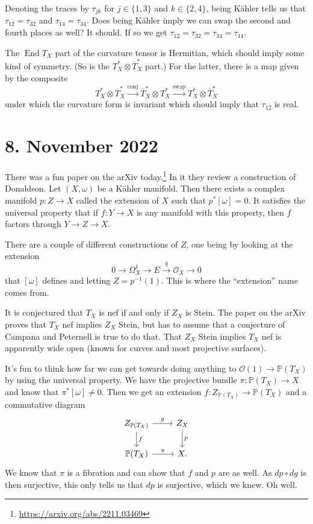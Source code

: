 \documentclass[11pt]{amsart}
\theoremstyle{definition}
\newcommand{\kk}[1]{\mathbb{#1}}
\newcommand{\cc}[1]{\mathcal{#1}}
\def\ov#1{\overline{#1}}
\DeclareMathOperator{\End}{End}
\begin{document}
Denoting the traces by $\tau_{jk}$ for $j \in \{1, 3\}$ and $k \in \{2, 4\}$,
being K\"ahler tells us that $\tau_{12} = \tau_{32}$ and $\tau_{14} = \tau_{34}$.
Does being K\"ahler imply we can swap the second and fourth places as well?
It should.
If so we get $\tau_{12} = \tau_{32} = \tau_{34} = \tau_{14}$.

The $\End T_X$ part of the curvature tensor is Hermitian, which should imply
some kind of symmetry. (So is the $T_X^* \otimes \ov T_X^*$ part.)
For the latter, there is a map given by the composite
$$
T_X^* \otimes \ov T_X^* \stackrel{\text{conj}}{\longrightarrow}
\ov T_X^* \otimes T_X^* \stackrel{\text{swap}}{\longrightarrow}
T_X^* \otimes \ov T_X^*
$$
under which the curvature form is invariant
which should imply that $\tau_{12}$ is real.

\section{8. November 2022}

There was a fun paper on the arXiv today.\footnote{\url{https://arxiv.org/abs/2211.03469}}
In it they review a construction of Donaldson.
Let $(X,\omega)$ be a K\"ahler manifold.
Then there exists a complex manifold $p : Z \to X$ called the extension of $X$
such that $p^*[\omega] = 0$.
It satisfies the universal property that if $f : Y \to X$ is any manifold with
this property, then $f$ factors through $Y \to Z \to X$.

There are a couple of different constructions of $Z$, one being by looking at
the extension
$$
0 \longrightarrow
\Omega_X^1 \longrightarrow
E \stackrel{q}{\longrightarrow}
\mathcal O_X \longrightarrow 0
$$
that $[\omega]$ defines and letting $Z = p^{-1}(1)$.
This is where the ``extension'' name comes from.

It is conjectured that $T_X$ is nef if and only if $Z_X$ is Stein.
The paper on the arXiv proves that $T_X$ nef implies $Z_X$ Stein, but has to
assume that a conjecture of Campana and Peternell is true to do that.
That $Z_X$ Stein implies $T_X$ nef is apparently wide open (known for curves
and most projective surfaces).

It's fun to think how far we can get towards doing anything to $\cc O(1) \to
\kk P(T_X)$ by using the universal property.
We have the projective bundle $\pi : \kk P(T_X) \to X$ and know that
$\pi^*[\omega] \not= 0$.
Then we get an extension $f : Z_{\kk P(T_X)} \to \kk P(T_X)$ and a commutative diagram
$$
\begin{tikzcd}
Z_{\kk P(T_X)}
\ar[r,"g"] \ar[d,"f"]
&
Z_X
\ar[d,"p"]
\\
\kk P(T_X)
\ar[r, "\pi"]
&
X.
\end{tikzcd}
$$
We know that $\pi$ is a fibration and can show that $f$ and $p$ are as well.
As $dp \circ dg$ is then surjective, this only tells us that $dp$ is
surjective, which we knew.
Oh well.
\end{document}
